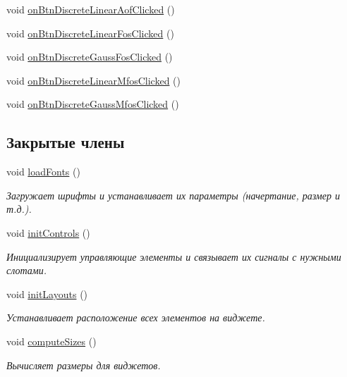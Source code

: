 \begin{DoxyCompactItemize}
\item 
void \hyperlink{class_filter_start_buttons_box_ac9e49cc4f6c8d9712c807e1b0711f67a}{on\+Btn\+Discrete\+Linear\+Aof\+Clicked} ()
\item 
void \hyperlink{class_filter_start_buttons_box_abca20b7c058a4305904912a8e9ea87db}{on\+Btn\+Discrete\+Linear\+Fos\+Clicked} ()
\item 
void \hyperlink{class_filter_start_buttons_box_a0285f32777c968c369c25c91940837d0}{on\+Btn\+Discrete\+Gauss\+Fos\+Clicked} ()
\item 
void \hyperlink{class_filter_start_buttons_box_ac200f7d204677620288463458a0d5dea}{on\+Btn\+Discrete\+Linear\+Mfos\+Clicked} ()
\item 
void \hyperlink{class_filter_start_buttons_box_adbba7359eb2dd93c889c62665f5f70c2}{on\+Btn\+Discrete\+Gauss\+Mfos\+Clicked} ()
\end{DoxyCompactItemize}

\subsection*{Закрытые члены}
\begin{DoxyCompactItemize}
\item 
void \hyperlink{class_filter_start_buttons_box_ae3a208f9857ce99c02506e4005f71a60}{load\+Fonts} ()
\begin{DoxyCompactList}\small\item\em Загружает шрифты и устанавливает их параметры (начертание, размер и т.\+д.). \end{DoxyCompactList}\item 
\hypertarget{class_filter_start_buttons_box_a8803e94f68319169bbaeca632d07f9ff}{}\label{class_filter_start_buttons_box_a8803e94f68319169bbaeca632d07f9ff} 
void \hyperlink{class_filter_start_buttons_box_a8803e94f68319169bbaeca632d07f9ff}{init\+Controls} ()
\begin{DoxyCompactList}\small\item\em Инициализирует управляющие элементы и связывает их сигналы с нужными слотами. \end{DoxyCompactList}\item 
\hypertarget{class_filter_start_buttons_box_afe5d665350bff81aa8f2549fc2e26144}{}\label{class_filter_start_buttons_box_afe5d665350bff81aa8f2549fc2e26144} 
void \hyperlink{class_filter_start_buttons_box_afe5d665350bff81aa8f2549fc2e26144}{init\+Layouts} ()
\begin{DoxyCompactList}\small\item\em Устанавливает расположение всех элементов на виджете. \end{DoxyCompactList}\item 
void \hyperlink{class_filter_start_buttons_box_a8e47c16d04fd134af5475f77a2bbeb52}{compute\+Sizes} ()
\begin{DoxyCompactList}\small\item\em Вычисляет размеры для виджетов. \end{DoxyCompactList}\end{DoxyCompactItemize}
